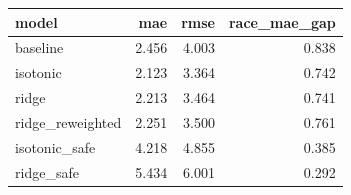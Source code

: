 \begin{tabular}{lrrr}
\toprule
model & mae & rmse & race\_mae\_gap \\
\midrule
baseline & 2.456 & 4.003 & 0.838 \\
isotonic & 2.123 & 3.364 & 0.742 \\
ridge & 2.213 & 3.464 & 0.741 \\
ridge\_reweighted & 2.251 & 3.500 & 0.761 \\
isotonic\_safe & 4.218 & 4.855 & 0.385 \\
ridge\_safe & 5.434 & 6.001 & 0.292 \\
\bottomrule
\end{tabular}

